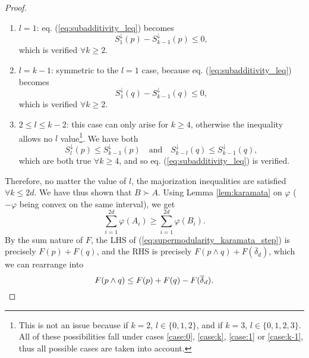 \begin{proof}
\begin{enumerate}[resume]
        \item \underline{$l = 1$}: eq. (\ref{eq:subadditivity_leq}) becomes \label{case:1}
        \begin{equation}
            S^\downarrow_1(p) - S^\downarrow_{k-1}(p) \leq 0,
        \end{equation}
        which is verified $\forall k \geq 2$.
        \item \underline{$l = k - 1$}: symmetric to the $l = 1$ case, because eq. (\ref{eq:subadditivity_leq}) becomes \label{case:k-1}
        \begin{equation}
            S^\downarrow_1(q) - S^\downarrow_{k-1}(q) \leq 0,
        \end{equation}
        which is verified $\forall k \geq 2$.
        \item \underline{$2 \leq l \leq k-2$}: this case can only arise for $k \geq 4$, otherwise the inequality allows no $l$ value\footnote{This is not an issue because if $k=2$, $l \in \{0, 1, 2\}$, and if $k = 3$, $l \in \{0, 1, 2, 3\}$. All of these possibilities fall under cases \ref{case:0}, \ref{case:k}, \ref{case:1} or \ref{case:k-1}, thus all possible cases are taken into account.}. We have both \label{case:rest}
        \begin{equation}
            S^\downarrow_l (p) \leq S^\downarrow_{k-1}(p) \quad \text{and} \quad S^\downarrow_{k-l} (q) \leq S^\downarrow_{k-1}(q),
        \end{equation}
        which are both true $\forall k \geq 4$, and so eq. (\ref{eq:subadditivity_leq}) is verified. %
    \end{enumerate}
    Therefore, no matter the value of $l$, the majorization inequalities are satisfied $\forall k \leq 2d$. We have thus shown that $B \succ A$.
    Using Lemma \ref{lem:karamata} on $\varphi$ ($-\varphi$ being convex on the same interval), we get
    \begin{equation} \label{eq:subadditivity_karamata_step}
        \sum_{i=1}^{2d} \varphi(A_i) \geq \sum_{i=1}^{2d} \varphi(B_i).
    \end{equation}
    By the sum nature of $F$, the LHS of (\ref{eq:supermodularity_karamata_step}) is precisely $F(p) + F(q)$, and the RHS is precisely $F(p \wedge q) + F(\overline{\delta}_d)$, which we can rearrange into
    \begin{equation}
        F(p \wedge q) \leq F(p) + F(q) - F(\overline{\delta}_d). \qedhere
    \end{equation}
\end{proof}

